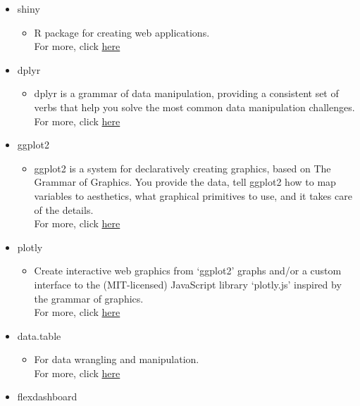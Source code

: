\documentclass[
]{article}
\providecommand{\tightlist}{%
  \setlength{\itemsep}{0pt}\setlength{\parskip}{0pt}}
\begin{document}
\begin{itemize}
\tightlist
\item
  shiny

  \begin{itemize}
  \tightlist
  \item
    R package for creating web applications.\\
    For more, click \href{https://shiny.rstudio.com/tutorial/}{here}
  \end{itemize}
\item
  dplyr

  \begin{itemize}
  \tightlist
  \item
    dplyr is a grammar of data manipulation, providing a consistent set
    of verbs that help you solve the most common data manipulation
    challenges.\\
    For more, click
    \href{https://cran.r-project.org/web/packages/dplyr/vignettes/dplyr.html}{here}
  \end{itemize}
\item
  ggplot2

  \begin{itemize}
  \tightlist
  \item
    ggplot2 is a system for declaratively creating graphics, based on
    The Grammar of Graphics. You provide the data, tell ggplot2 how to
    map variables to aesthetics, what graphical primitives to use, and
    it takes care of the details.\\
    For more, click \href{https://ggplot2.tidyverse.org/}{here}
  \end{itemize}
\item
  plotly

  \begin{itemize}
  \tightlist
  \item
    Create interactive web graphics from `ggplot2' graphs and/or a
    custom interface to the (MIT-licensed) JavaScript library
    `plotly.js' inspired by the grammar of graphics.\\
    For more, click \href{https://plotly.com/r/getting-started/}{here}
  \end{itemize}
\item
  data.table

  \begin{itemize}
  \tightlist
  \item
    For data wrangling and manipulation.\\
    For more, click
    \href{https://cran.r-project.org/web/packages/data.table/vignettes/datatable-intro.html}{here}
  \end{itemize}
\item
  flexdashboard


\end{itemize}
\end{document}
